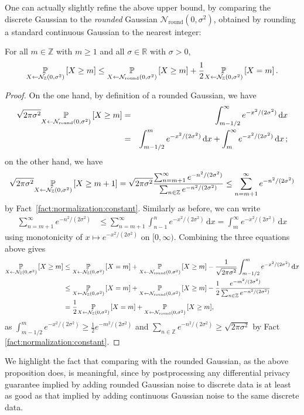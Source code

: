 \documentclass{jpcfinal} %
\newcommand{\roundN}{\mathcal{N}_{\text{round}}}
\newcommand{\dgausss}[2]{{\discN\left(#1,#2\right)}}
\newcommand{\dgauss}[1]{\dgausss{0}{#1}}
\newcommand{\pr}[2]{{\ifx&#1& \mathbb{P} \else
\underset{#1}{\mathbb{P}} \fi \left[#2\right]}}
\newcommand{\dx}[1][x]{\mathrm{d}#1}
\newcommand{\Z}{\mathbb{Z}}
\newcommand{\R}{\mathbb{R}}
\begin{document}
One can actually slightly refine the above upper bound, by comparing the discrete Gaussian to the \emph{rounded} Gaussian $\roundN(0,\sigma^2)$, obtained by rounding a standard continuous Gaussian to the nearest integer:
\begin{prop}\label{prop:upper:bound:gaussian:2}
For all $m \in \Z$ with $m \ge 1$ and all $\sigma \in \R$ with $\sigma>0$, 
\[
    \pr{X \gets \dgauss{\sigma^2}}{X \ge m} 
\le \pr{X \gets \roundN(0,\sigma^2)}{X \ge m} 
            + \frac{1}{2}\pr{X \gets \dgauss{\sigma^2}}{X = m}\,.
\]
\end{prop}
\begin{proof}
On the one hand, by definition of a rounded Gaussian, we have
\begin{eqnarray*}
\sqrt{2\pi\sigma^2}\pr{X \gets \roundN(0,\sigma^2)}{X \ge m}
 & = & \int_{m-1/2}^\infty e^{-x^2/(2\sigma^2)}\, \dx\\
 & = & \int_{m-1/2}^m e^{-x^2/(2\sigma^2)}\, \dx + \int_{m}^\infty e^{-x^2/(2\sigma^2)}\, \dx\,;
\end{eqnarray*}
on the other hand, we have
\[
    \sqrt{2\pi\sigma^2}\pr{X \gets \dgauss{\sigma^2}}{X \ge m+1} 
    = \sqrt{2\pi\sigma^2}\frac{\sum_{n=m+1}^\infty e^{-n^2/(2\sigma^2)}}{\sum_{n\in\Z} e^{-n^2/(2\sigma^2)}} \leq \sum_{n=m+1}^\infty e^{-n^2/(2\sigma^2)}
\]
by Fact~\ref{fact:normalization:constant}. Similarly as before, we can write
\begin{align*}
\sum_{n=m+1}^\infty e^{-n^2/(2\sigma^2)}
&\leq \sum_{n=m+1}^\infty \int_{n-1}^n e^{-x^2/(2\sigma^2)}\,\dx
= \int_{m}^\infty e^{-x^2/(2\sigma^2)}\,\dx
\end{align*}
using monotonicity of $x\mapsto e^{-x^2/(2\sigma^2)}$ on $[0,\infty)$. Combining the three equations above gives
\begin{align*}
    \pr{X \gets \dgauss{\sigma^2}}{X \ge m} 
    &\leq \pr{X \gets \dgauss{\sigma^2}}{X = m} + \pr{X \gets \roundN(0,\sigma^2)}{X \ge m} - \frac{1}{\sqrt{2\pi\sigma^2}}\int_{m-1/2}^m e^{-x^2/(2\sigma^2)}\, \dx
     \\
    &\leq \pr{X \gets \dgauss{\sigma^2}}{X = m} 
    + \pr{X \gets \roundN(0,\sigma^2)}{X \ge m} - \frac{1}{2}\frac{e^{-m^2/(2\sigma^2) }}{\sum_{n\in\Z} e^{-n^2/(2\sigma^2)} }\\
    &= \frac12 \pr{X \gets \dgauss{\sigma^2}}{X = m} 
    + \pr{X \gets \roundN(0,\sigma^2)}{X \ge m},
\end{align*}
as $\int_{m-1/2}^m e^{-x^2/(2\sigma^2) }\geq \frac{1}{2}e^{-m^2/(2\sigma^2) }$ and $\sum_{n\in\Z} e^{-n^2/(2\sigma^2)} \geq \sqrt{2\pi\sigma^2}$ by Fact \ref{fact:normalization:constant}.
\end{proof}
We highlight the fact that comparing with the rounded Gaussian, as the above proposition does, is meaningful, since by postprocessing any differential privacy guarantee implied by adding rounded Gaussian noise to discrete data is at least as good as that implied by adding continuous Gaussian noise to the same discrete data.
\end{document}
